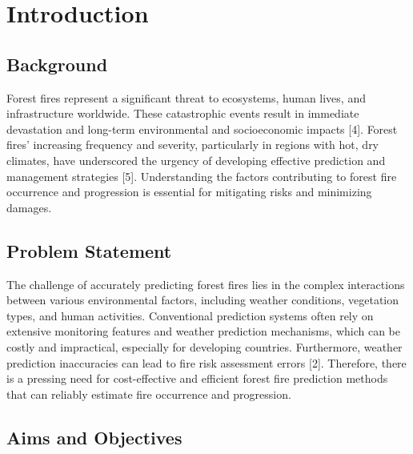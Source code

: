 \chapter{Introduction}
\label{ch:into} %



\section{Background}
\label{sec:into_back}
Forest fires represent a significant threat to ecosystems, human lives, and infrastructure worldwide. These catastrophic events result in immediate devastation and long-term environmental and socioeconomic impacts [4]. Forest fires' increasing frequency and severity, particularly in regions with hot, dry climates, have underscored the urgency of developing effective prediction and management strategies [5]. Understanding the factors contributing to forest fire occurrence and progression is essential for mitigating risks and minimizing damages.


\section{Problem Statement}
\label{sec:into_back}

The challenge of accurately predicting forest fires lies in the complex interactions between various environmental factors, including weather conditions, vegetation types, and human activities. Conventional prediction systems often rely on extensive monitoring features and weather prediction mechanisms, which can be costly and impractical, especially for developing countries. Furthermore, weather prediction inaccuracies can lead to fire risk assessment errors [2]. Therefore, there is a pressing need for cost-effective and efficient forest fire prediction methods that can reliably estimate fire occurrence and progression.


\section{Aims and Objectives}
\label{sec:into_back}

